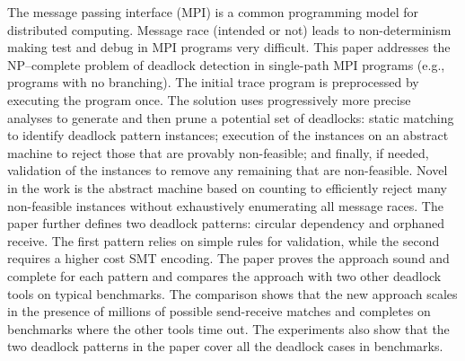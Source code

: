 The message passing interface (MPI) is a common programming model for distributed computing. Message race (intended or not) leads to non-determinism making test and debug in MPI programs very difficult. This paper addresses the NP--complete problem of deadlock detection in single-path MPI programs (e.g., programs with no branching). 
The initial trace program is preprocessed by executing the program once.
The solution uses progressively more precise analyses to generate and then prune a potential set of deadlocks: static matching to identify deadlock pattern instances; execution of the instances on an abstract machine to reject those that are provably non-feasible; and finally, if needed, validation of the instances to remove any remaining that are non-feasible. Novel in the work is the abstract machine based on counting to efficiently reject many non-feasible instances without exhaustively enumerating all message races.  The paper further defines two deadlock patterns: circular dependency and orphaned receive. The first pattern relies on simple rules for validation, while the second requires a higher cost SMT encoding. The paper proves the approach sound and complete for each pattern and compares the approach with two other deadlock tools on typical benchmarks. The comparison shows that the new approach scales in the presence of millions of possible send-receive matches and completes on benchmarks where the other tools time out. The experiments also show that the two deadlock patterns in the paper cover all the deadlock cases in benchmarks. 
